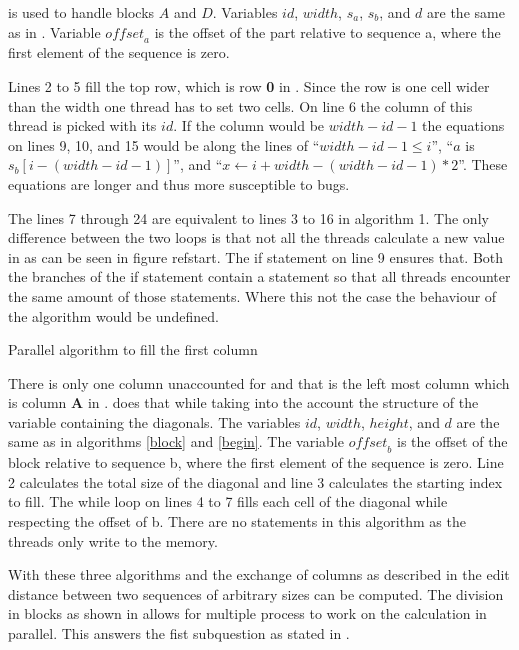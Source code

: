  is used to handle blocks $A$ and $D$.
Variables $id$, $width$, $s_a$, $s_b$, and $d$ are the same as in .
Variable $\mathit{offset}_a$ is the offset of the part relative to sequence a, where the first element of the sequence is zero.

Lines 2 to 5 fill the top row, which is row \textbf{0} in .
Since the row is one cell wider than the width one thread has to set two cells.
On line 6 the column of this thread is picked with its $id$.
If the column would be $width - id - 1$ the equations on lines 9, 10, and 15 would be along the lines of ``$width - id - 1 \leq i$'', ``$a$ is $s_b[i-(width-id-1)]$'', and ``$x \gets i + width - (width - id - 1) * 2$''.
These equations are longer and thus more susceptible to bugs.

The lines 7 through 24 are equivalent to lines 3 to 16 in algorithm 1.
The only difference between the two loops is that not all the threads calculate a new value in  as can be seen in figure ref{start}.
The if statement on line 9 ensures that.
Both the branches of the if statement contain a  statement so that all threads encounter the same amount of those statements.
Where this not the case the behaviour of the algorithm would be undefined.

\begin{algorithm}
\caption{Parallel algorithm to fill the first column} \label{fill_column}
\begin{algorithmic}[1]
    \EndWhile
\EndProcedure
\end{algorithmic}
\end{algorithm}

There is only one column unaccounted for and that is the left most column which is column \textbf{A} in .
 does that while taking into the account the structure of the variable containing the diagonals.
The variables $id$, $width$, $height$, and $d$ are the same as in algorithms \ref{block} and \ref{begin}.
The variable $\mathit{offset}_b$ is the offset of the block relative to sequence b, where the first element of the sequence is zero.
Line 2 calculates the total size of the diagonal and line 3 calculates the starting index to fill.
The while loop on lines 4 to 7 fills each cell of the diagonal while respecting the offset of b.
There are no  statements in this algorithm as the threads only write to the memory.

With these three algorithms and the exchange of columns as described in  the edit distance between two sequences of arbitrary sizes can be computed.
The division in blocks as shown in  allows for multiple process to work on the calculation in parallel.
This answers the fist subquestion as stated in .

